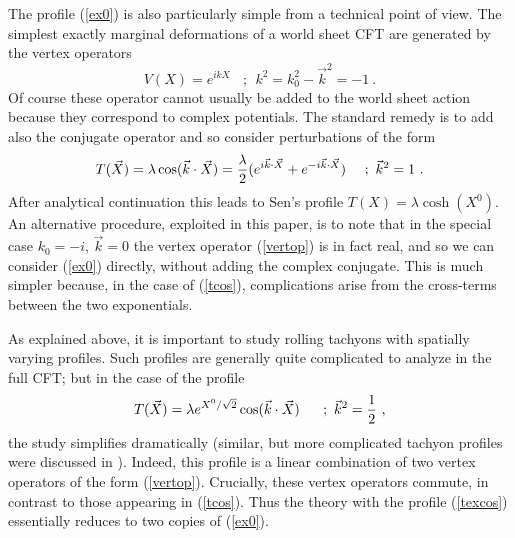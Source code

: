 \documentclass[a4paper,12pt]{article}
\begin{document}
The profile (\ref{ex0}) is also particularly simple from a technical point of view. The simplest
exactly marginal deformations of a world sheet CFT are generated by the vertex operators
\begin{equation}
V(X)=e^{ikX}~~~~;~~ k^2=k^2_0-\vec{k}^2=-1~.
\label{vertop}
\end{equation}
Of course these operator cannot usually be added to the world sheet action because they correspond to 
complex potentials. The standard remedy is to add also the conjugate operator and so consider 
perturbations of the form
\begin{equation}
T(\vec{X})=\lambda
\cos(\vec{k}\cdot\vec{X})= {\lambda\over 2}(e^{i\vec{k}\cdot\vec{X}}+e^{-i\vec{k}\cdot\vec{X}})~~~~;
~\vec{k}^2=1~.
\label{tcos}
\end{equation}
After analytical continuation this leads to Sen's profile 
$T(X)=\lambda\cosh(X^0)$.
An alternative procedure, exploited in this paper, is to note that in the special case 
$k_0=-i$, $\vec{k}=0$ the vertex operator (\ref{vertop}) is in fact real, and so we can consider 
(\ref{ex0}) directly, without adding the complex conjugate. 
This is much simpler because, in the case of (\ref{tcos}), complications arise from
the cross-terms between the two exponentials.

As explained above, it is important to study rolling tachyons with spatially varying profiles. Such profiles are generally quite complicated to analyze in the full CFT; but in the case of the 
profile
\begin{equation}
T(\vec{X})=\lambda e^{X^0/\sqrt{2}}\cos(\vec{k}\cdot\vec{X})~~~~~;~\vec{k}^2={1\over 2}~,
\label{texcos}
\end{equation}
the study simplifies dramatically (similar, but more complicated tachyon profiles were discussed in \cite{senspac}). Indeed, this profile is a linear combination of two vertex operators of the form (\ref{vertop}). Crucially, these vertex operators commute, in contrast to those
appearing in (\ref{tcos}). Thus the theory with the profile (\ref{texcos}) essentially 
reduces to two copies of (\ref{ex0}). 
\end{document}
